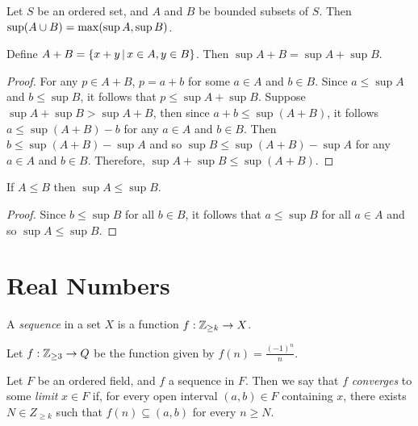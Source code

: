 \begin{prop}
    Let $S$ be an ordered set, and $A$ and $B$ be bounded subsets of $S$. Then $\sup (A \cup B) = \max (\sup A, \sup B)$.
\end{prop}

\begin{prop}
    Define $A + B = \left\{x + y \,\middle|\, x \in A, y \in B\right\}$. Then $\sup A + B = \sup A + \sup B$.
\end{prop}

\begin{proof}
    For any $p \in A + B$, $p = a + b$ for some $a \in A$ and $b \in B$. Since $a \leq \sup A$ and $b \leq \sup B$, it follows that $p \leq \sup A + \sup B$. Suppose $\sup A + \sup B > \sup A + B$, then since $a + b \leq \sup (A + B)$, it follows $a \leq \sup (A + B) - b$ for any $a \in A$ and $b \in B$. Then $b \leq \sup (A + B) - \sup A$ and so $\sup B \leq \sup (A + B) - \sup A$ for any $a \in A$ and $b \in B$. Therefore, $\sup A + \sup B \leq \sup (A + B)$.
\end{proof}

\begin{prop}
    If $A \leq B$ then $\sup A \leq \sup B$.
\end{prop}

\begin{proof}
    Since $b \leq \sup B$ for all $b \in B$, it follows that $a \leq \sup B$ for all $a \in A$ and so $\sup A \leq \sup B$.
\end{proof}

\section{Real Numbers}

\begin{defn}
    A \emph{sequence} in a set $X$ is a function $f: \mathbb{Z}_{\geq k} \to X$.
\end{defn}

\begin{exmp}
    Let $f: \mathbb{Z}_{\geq 3} \to Q$ be the function given by $f(n) = \frac{(-1)^n}{n}$.
\end{exmp}

\begin{defn}
    Let $F$ be an ordered field, and $f$ a sequence in $F$. Then we say that $f$ \emph{converges} to some \emph{limit} $x \in F$ if, for every open interval $(a, b) \in F$ containing $x$, there exists $N \in Z_{\geq k}$ such that $f(n) \subseteq (a, b)$ for every $n \geq N$.
\end{defn}

